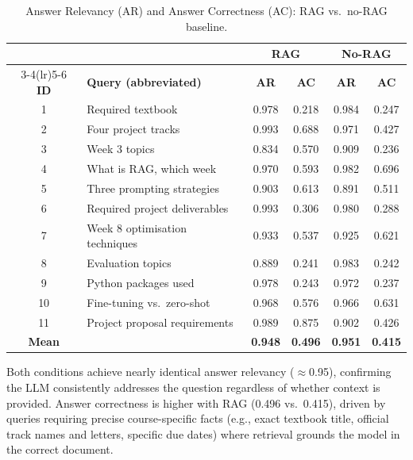 \documentclass[11pt,a4paper]{article}
\begin{document}
\begin{table}[H]
\centering
\small
\caption{Answer Relevancy (AR) and Answer Correctness (AC): RAG vs.\ no-RAG baseline.}
\label{tab:comparison}
\begin{tabular}{clcccc}
\toprule
& & \multicolumn{2}{c}{\textbf{RAG}} & \multicolumn{2}{c}{\textbf{No-RAG}} \\
\cmidrule(lr){3-4}\cmidrule(lr){5-6}
\textbf{ID} & \textbf{Query (abbreviated)} & \textbf{AR} & \textbf{AC} & \textbf{AR} & \textbf{AC} \\
\midrule
1  & Required textbook               & 0.978 & 0.218 & 0.984 & 0.247 \\
2  & Four project tracks             & 0.993 & 0.688 & 0.971 & 0.427 \\
3  & Week 3 topics                   & 0.834 & 0.570 & 0.909 & 0.236 \\
4  & What is RAG, which week         & 0.970 & 0.593 & 0.982 & 0.696 \\
5  & Three prompting strategies      & 0.903 & 0.613 & 0.891 & 0.511 \\
6  & Required project deliverables   & 0.993 & 0.306 & 0.980 & 0.288 \\
7  & Week 8 optimisation techniques  & 0.933 & 0.537 & 0.925 & 0.621 \\
8  & Evaluation topics               & 0.889 & 0.241 & 0.983 & 0.242 \\
9  & Python packages used            & 0.978 & 0.243 & 0.972 & 0.237 \\
10 & Fine-tuning vs.\ zero-shot      & 0.968 & 0.576 & 0.966 & 0.631 \\
11 & Project proposal requirements   & 0.989 & 0.875 & 0.902 & 0.426 \\
\midrule
\textbf{Mean} & & \textbf{0.948} & \textbf{0.496} & \textbf{0.951} & \textbf{0.415} \\
\bottomrule
\end{tabular}
\end{table}

Both conditions achieve nearly identical answer relevancy ($\approx$0.95), confirming
the LLM consistently addresses the question regardless of whether context is provided.
Answer correctness is higher with RAG (0.496 vs.\ 0.415), driven by queries requiring
precise course-specific facts (e.g., exact textbook title, official track names and
letters, specific due dates) where retrieval grounds the model in the correct document.

\end{document}
